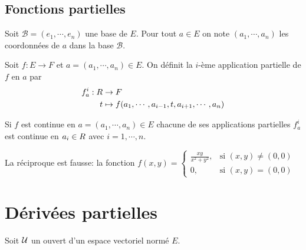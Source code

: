 \subsection{Fonctions partielles}

Soit  $\mathcal B=(e_1,\cdots,e_n)$ une base de $E$. Pour tout $a \in E$ on note $(a_1,\cdots,a_n)$ les coordonnées de $a$ dans la base  $\mathcal B$.

\begin{definition}
    Soit $f:  E \to F$ et $a = (a_1,\cdots,a_n) \in E$. On définit la $i$-ème application partielle de $f$ en $a$ par
    \begin{align*}
        f^i_a: R &\to F \\
        t &\mapsto f(a_1,\cdots,a_{i-1}, t, a_{i+1},\cdots,a_n)
    \end{align*}
\end{definition}

\begin{proposition}
    Si $f$ est continue en $a = (a_1,\cdots,a_n) \in E$ chacune de ses applications partielles $f^i_a$ est continue en $a_i\in R$ avec $i=1,\cdots,n$.
\end{proposition}


\begin{remark}
    La réciproque est fausse: la fonction $f(x,y)= \begin{cases}\frac{xy}{x^2+y^2}, &\text{si $(x,y) \neq (0,0)$} \\ 0, & \text{si $(x,y) =(0,0)$ }\end{cases}$
    \pl{\rep{5cm}}	
\end{remark}

\section{Dérivées partielles }



Soit $\mathcal{U}$ un ouvert d'un espace vectoriel normé $E$.


